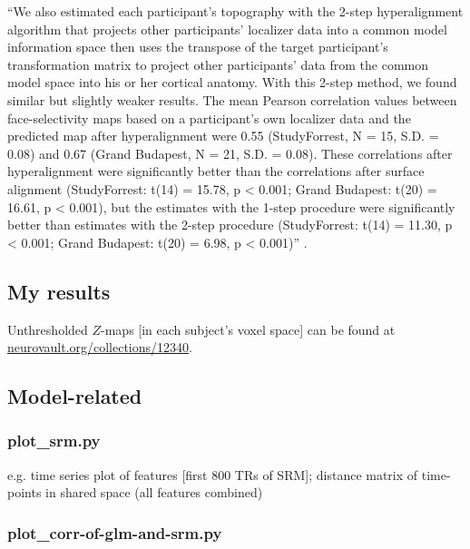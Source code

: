 ``We also estimated each participant’s topography with the 2-step hyperalignment
algorithm that projects other participants’ localizer data into a common model
information space then uses the transpose of the target participant’s
transformation matrix to project other participants’ data from the common model
space into his or her cortical anatomy. With this 2-step method, we found
similar but slightly weaker results. The mean Pearson correlation values between
face-selectivity maps based on a participant’s own localizer data and the
predicted map after hyperalignment were 0.55 (StudyForrest, N = 15, S.D. = 0.08)
and 0.67 (Grand Budapest, N = 21, S.D. = 0.08). These correlations after
hyperalignment were significantly better than the correlations after surface
alignment (StudyForrest: t(14) = 15.78, p < 0.001; Grand Budapest: t(20) =
16.61, p < 0.001), but the estimates with the 1-step procedure were
significantly better than estimates with the 2-step procedure (StudyForrest:
t(14) = 11.30, p < 0.001; Grand Budapest: t(20) = 6.98, p < 0.001)''
\citep{jiahui2020predicting}.


\subsection{My results}

Unthresholded $Z$-maps [in each subject's voxel space] can be found at
\href{https://identifiers.org/neurovault.collection:12340}{\url{neurovault.org/collections/12340}}.

\subsection{Model-related}

\subsubsection{plot\_srm.py}


e.g. time series plot of features [first 800 TRs of SRM]; distance matrix of
time-points in shared space (all features combined)


\subsubsection{plot\_corr-of-glm-and-srm.py}


